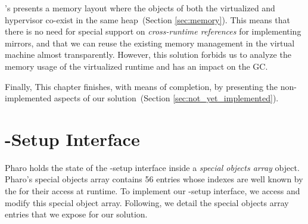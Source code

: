 \Vtt's presents a memory layout where the objects of both the virtualized and hypervisor co-exist in the same heap~(Section \ref{sec:memory}). This means that there is no need for special support on \emph{cross-runtime references} for implementing \eg mirrors, and that we can reuse the existing memory management in the virtual machine almost transparently.
However, this solution forbids us to analyze the memory usage of the virtualized runtime and has an impact on the GC.

Finally, This chapter finishes, with means of completion, by presenting the non-implemented aspects of our solution~(Section \ref{sec:not_yet_implemented}).

\section{\VM-Setup Interface}\label{sec:setup_interface}

Pharo \VM holds the state of the \VM-setup interface inside a \emph{special objects array} object. Pharo's special objects array contains 56 entries whose indexes are well known by the \VM for their access at runtime. To implement our \VM-setup interface, we access and modify this special object array. Following, we detail the special objects array entries that we expose for our solution.

